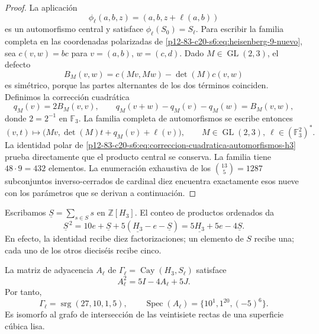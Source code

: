 \begin{proof}
La aplicación
\[
 \phi_\ell(a,b,z)=(a,b,z+\ell(a,b))
\]
es un automorfismo central y satisface
\(\phi_\ell(S_0)=S_\ell\). Para escribir la familia completa en las
coordenadas polarizadas de \cref{p12-83-c20-s6:eq:heisenberg-9-nuevo}, sea
\(c(v,w)=b c\) para \(v=(a,b)\), \(w=(c,d)\). Dado
\(M\in\operatorname{GL}(2,3)\), el defecto
\[
 B_M(v,w)=c(Mv,Mw)-\det(M)c(v,w)
\]
es simétrico, porque las partes alternantes de los dos términos coinciden.
Definimos la corrección cuadrática
\begin{equation}
 q_M(v)=2B_M(v,v),
 \qquad
 q_M(v+w)-q_M(v)-q_M(w)=B_M(v,w),
 \label{p12-83-c20-s6:eq:correccion-cuadratica-automorfismos-h3}
\end{equation}
donde \(2=2^{-1}\) en \(\mathbb F_3\). La familia completa de
automorfismos se escribe entonces
\begin{equation}
 (v,t)\longmapsto
 \bigl(Mv,\det(M)t+q_M(v)+\ell(v)\bigr),
 \qquad M\in\operatorname{GL}(2,3),\
 \ell\in(\mathbb F_3^2)^*.
 \label{p12-83-c20-s6:eq:automorfismos-h3-completos}
\end{equation}
La identidad polar de \cref{p12-83-c20-s6:eq:correccion-cuadratica-automorfismos-h3}
prueba directamente que el producto central se conserva. La familia tiene
\(48\cdot9=432\) elementos. La enumeración exhaustiva de los
\(\binom{13}{5}=1287\) subconjuntos inverso-cerrados de cardinal diez
encuentra exactamente esos nueve con los parámetros que se derivan a
continuación.
\end{proof}

Escribamos \(\underline S=\sum_{s\in S}s\) en
\(\mathbb Z[H_3]\). El conteo de productos ordenados da
\begin{equation}
 \underline S^{\,2}
 =10e+\underline S+5(\underline{H_3}-e-\underline S)
 =5\underline{H_3}+5e-4\underline S.
 \label{p12-83-c20-s6:eq:identidad-grupo-schlafli-nueva}
\end{equation}
En efecto, la identidad recibe diez factorizaciones; un elemento de
\(S\) recibe una; cada uno de los otros dieciséis recibe cinco.

\begin{theorem}
\label{p12-83-c20-s6:thm:grafo-27-rectas-nuevo}
La matriz de adyacencia \(A_\ell\) de
\(\Gamma_\ell=\operatorname{Cay}(H_3,S_\ell)\) satisface
\begin{equation}
 A_\ell^2=5I-4A_\ell+5J.
 \label{p12-83-c20-s6:eq:identidad-schlafli-nueva}
\end{equation}
Por tanto,
\[
 \Gamma_\ell=\operatorname{srg}(27,10,1,5),
 \qquad
 \operatorname{Spec}(A_\ell)=\{10^1,1^{20},(-5)^6\}.
\]
Es isomorfo al grafo de intersección de las veintisiete rectas de una
superficie cúbica lisa.
\end{theorem}

